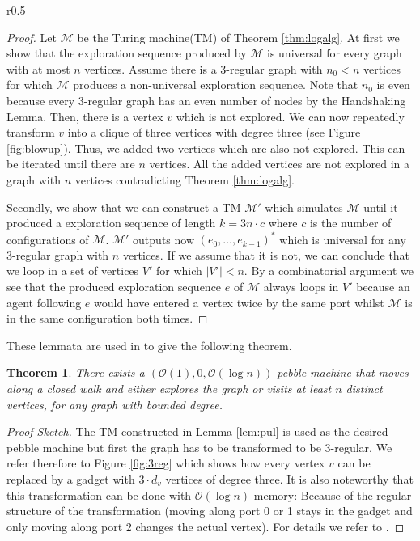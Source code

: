 \documentclass[oneside]{scrartcl}
\newtheorem{thm}{Theorem}
\begin{document}
\begin{wrapfigure}{r}{0.5\textwidth}
  \flushright{\resizebox{0.4\textwidth}{!}{}}
  \caption{Illustration how to transform any graph to a 3-regular graph.}
  \label{fig:3reg}
\end{wrapfigure}
\begin{proof}
  Let $\mathcal{M}$ be the Turing machine(TM) of Theorem \ref{thm:logalg}.
  At first we show that the exploration sequence produced by $\mathcal{M}$ is
  universal for every graph with at most $n$ vertices. Assume there
  is a 3-regular graph with $n_{0} < n$ vertices for which $\mathcal{M}$
  produces a non-universal exploration sequence. Note that $n_{0}$ is even
  because every 3-regular graph has an even number of nodes by the Handshaking
  Lemma. Then, there is a vertex $v$ which is not explored. We can now
  repeatedly transform $v$ into a clique of three vertices with degree three
  (see Figure \ref{fig:blowup}).
  Thus, we added two vertices which are also not explored. This can be iterated
  until there are $n$ vertices. All the added vertices are not explored in a
  graph with $n$ vertices contradicting Theorem \ref{thm:logalg}.

  Secondly, we show that we can construct a TM $\mathcal{M}'$ which simulates
  $\mathcal{M}$ until it produced a exploration sequence of length
  $k = 3n\cdot c$ where $c$ is the number of configurations of $\mathcal{M}$.
  $\mathcal{M}'$ outputs now $(e_{0},\dots,e_{k-1})^{\ast}$ which is universal
  for any 3-regular graph with $n$ vertices. If we assume that it is not, we
  can conclude that we loop in a set of vertices $V'$ for which $|V'|<n$. By a
  combinatorial argument we see that the produced exploration sequence $e$
  of $\mathcal{M}$ always loops in $V'$ because an agent following
  $e$ would have entered a vertex twice by the same port whilst $\mathcal{M}$
  is in the same configuration both times.
\end{proof}
These lemmata are used in \cite{pebbles} to give the following theorem.
\begin{thm}
  \label{thm:pebblewalk}
  There exists a $(\mathcal{O}(1),0,\mathcal{O}(\log n))$-pebble machine
  that moves along a closed walk and either explores the graph or visits
  at least $n$ distinct vertices, for any graph with bounded degree.
\end{thm}
\begin{proof}[Proof-Sketch]
  The TM constructed in Lemma \ref{lem:pul} is used as the desired pebble
  machine but first the graph has to be transformed to be 3-regular.
  We refer therefore to Figure \ref{fig:3reg} which shows how every vertex $v$
  can be replaced by a gadget with $3\cdot d_{v}$ vertices of degree three. It
  is also noteworthy that this transformation can be done with
  $\mathcal{O}(\log n)$ memory: Because of the regular structure of the
  transformation (moving along port 0 or 1 stays in the gadget and only
  moving along port 2 changes the actual vertex). For details we refer to
  \cite{pebbles}.
\end{proof}
\end{document}
